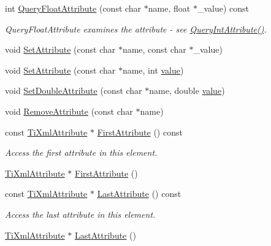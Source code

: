 \begin{DoxyCompactItemize}
int \hyperlink{class_ti_xml_element_aa04d3af11601ef5a5f88295203a843be}{QueryFloatAttribute} (const char $\ast$name, float $\ast$\_\-value) const 
\begin{DoxyCompactList}\small\item\em QueryFloatAttribute examines the attribute -\/ see \hyperlink{class_ti_xml_element_aea0bfe471380f281c5945770ddbf52b9}{QueryIntAttribute()}. \item\end{DoxyCompactList}\item 
void \hyperlink{class_ti_xml_element_abf0b3bd7f0e4c746a89ec6e7f101fc32}{SetAttribute} (const char $\ast$name, const char $\ast$\_\-value)
\item 
void \hyperlink{class_ti_xml_element_ace6f4be75e373726d4774073d666d1a7}{SetAttribute} (const char $\ast$name, int \hyperlink{class_ti_xml_node_aead528b3cedc33c16a6c539872c7cc8b}{value})
\item 
void \hyperlink{class_ti_xml_element_a0d1dd975d75496778177e35abfe0ec0b}{SetDoubleAttribute} (const char $\ast$name, double \hyperlink{class_ti_xml_node_aead528b3cedc33c16a6c539872c7cc8b}{value})
\item 
void \hyperlink{class_ti_xml_element_a56979767deca794376b1dfa69a525b2a}{RemoveAttribute} (const char $\ast$name)
\item 
const \hyperlink{class_ti_xml_attribute}{TiXmlAttribute} $\ast$ \hyperlink{class_ti_xml_element_a516054c9073647d6cb29b6abe9fa0592}{FirstAttribute} () const 
\begin{DoxyCompactList}\small\item\em Access the first attribute in this element. \item\end{DoxyCompactList}\item 
\hyperlink{class_ti_xml_attribute}{TiXmlAttribute} $\ast$ \hyperlink{class_ti_xml_element_a4b33780fc565d38d6b54f640e0cf1737}{FirstAttribute} ()
\item 
const \hyperlink{class_ti_xml_attribute}{TiXmlAttribute} $\ast$ \hyperlink{class_ti_xml_element_a86191b49f9177be132b85b14655f1381}{LastAttribute} () const 
\begin{DoxyCompactList}\small\item\em Access the last attribute in this element. \item\end{DoxyCompactList}\item 
\hyperlink{class_ti_xml_attribute}{TiXmlAttribute} $\ast$ \hyperlink{class_ti_xml_element_a222f81cf06155cd108f2a68d4d176004}{LastAttribute} ()

\end{DoxyCompactItemize}
